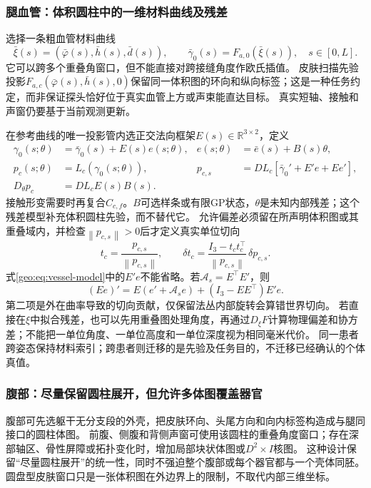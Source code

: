 \documentclass[11pt,a4paper]{article}
\numberwithin{equation}{section}
\theoremstyle{definition}
\newcommand{\R}{\mathbb R}
\newcommand{\norm}[1]{\left\lVert#1\right\rVert}
\begin{document}
\subsubsection{腿血管：体积圆柱中的一维材料曲线及残差}
选择一条粗血管材料曲线
\begin{equation}
 \bar\xi(s)=(\bar\varphi(s),\bar h(s),\bar d(s)),\qquad
 \bar\gamma_0(s)=F_{a,0}(\bar\xi(s)),\quad s\in[0,L].
 \label{geo:eq:vessel-material-prior}
\end{equation}
它可以跨多个重叠角窗口，但不能直接对跨接缝角度作欧氏插值。
皮肤扫描先验投影$F_{a,c}(\bar\varphi(s),\bar h(s),0)$保留同一体积图的环向和纵向标签；这是一种任务约定，而非保证探头恰好位于真实血管上方或声束能直达目标。
真实短轴、接触和声窗仍要基于当前观测更新。

在参考曲线的唯一投影管内选正交法向框架$E(s)\in\R^{3\times2}$，定义
\begin{align}
 \gamma_0(s;\theta)&=\bar\gamma_0(s)+E(s)e(s;\theta),
 &e(s;\theta)&=\bar e(s)+B(s)\theta,\\
 p_c(s;\theta)&=L_c(\gamma_0(s;\theta)),
 &p_{c,s}&=D L_c[\bar\gamma_0'+E'e+Ee'],\\
 D_\theta p_c&=D L_c E(s)B(s).
 \label{geo:eq:vessel-model}
\end{align}
接触形变需要时再复合$C_{c,f}$。$B$可选样条或有限GP状态，$\theta$是未知内部残差；这个残差模型补充体积圆柱先验，而不替代它。
允许偏差必须留在所声明体积图或其重叠域内，并检查$\norm{p_{c,s}}>0$后才定义真实单位切向
\begin{equation}
 t_c=\frac{p_{c,s}}{\norm{p_{c,s}}},\qquad
 \delta t_c=\frac{I_3-t_ct_c^{\top}}{\norm{p_{c,s}}}\,\delta p_{c,s}.
 \label{geo:eq:vessel-tangent}
\end{equation}
式\eqref{geo:eq:vessel-model}中的$E'e$不能省略。若$\mathcal A_s=E^{\top}E'$，则
\begin{equation}
 (Ee)'=E(e'+\mathcal A_s e)+(I_3-EE^{\top})E'e.
 \label{geo:eq:normal-bundle-derivative}
\end{equation}
第二项是外在曲率导致的切向贡献，仅保留法丛内部旋转会算错世界切向。
若直接在$\xi$中拟合残差，也可以先用重叠图处理角度，再通过$D_\xi F$计算物理偏差和协方差；不能把一单位角度、一单位高度和一单位深度视为相同毫米代价。
同一患者跨姿态保持材料索引；跨患者则迁移的是先验及任务目的，不迁移已经确认的个体真值。

\subsubsection{腹部：尽量保留圆柱展开，但允许多体图覆盖器官}
腹部可先选躯干无分支段的外壳，把皮肤环向、头尾方向和向内标签构造成与腿同接口的圆柱体图。
前腹、侧腹和背侧声窗可使用该圆柱的重叠角度窗口；存在深部轴区、骨性屏障或拓扑变化时，增加局部块状体图或$D^2\times I$核图。
这种设计保留“尽量圆柱展开”的统一性，同时不强迫整个腹部或每个器官都与一个壳体同胚。
圆盘型皮肤窗口只是一张体积图在外边界上的限制，不取代内部三维坐标。
\end{document}
